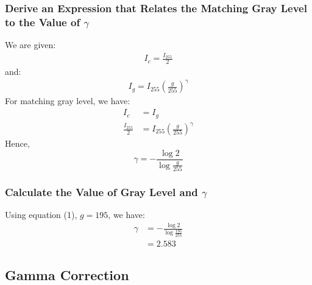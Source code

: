 \documentclass{article}
\begin{document}
	\subsubsection{Derive an Expression that Relates the Matching Gray Level
					to the Value of $\gamma$}
		We are given:
		\begin{align*}
			I_c = \frac{I_{255}}{2}
		\end{align*}
		and:
		\begin{align*}
			I_g = I_{255}(\frac{g}{255})^{\gamma}
		\end{align*}
		For matching gray level, we have:
		\begin{align*}
			I_c &= I_g \\
			\frac{I_{255}}{2} &= I_{255}(\frac{g}{255})^{\gamma}
		\end{align*}
		Hence,
		\begin{equation}
			\gamma = -{\frac{\log{2}}{\log{\frac{g}{255}}}}
		\end{equation}

	\subsubsection{Calculate the Value of Gray Level and $\gamma$}
		Using equation (1), $g=195$, we have:
		\begin{align*}
			\gamma &= -{\frac{\log{2}}{\log{\frac{195}{255}}}} \\
					&= 2.583
		\end{align*}

\subsection{Gamma Correction}
\end{document}
